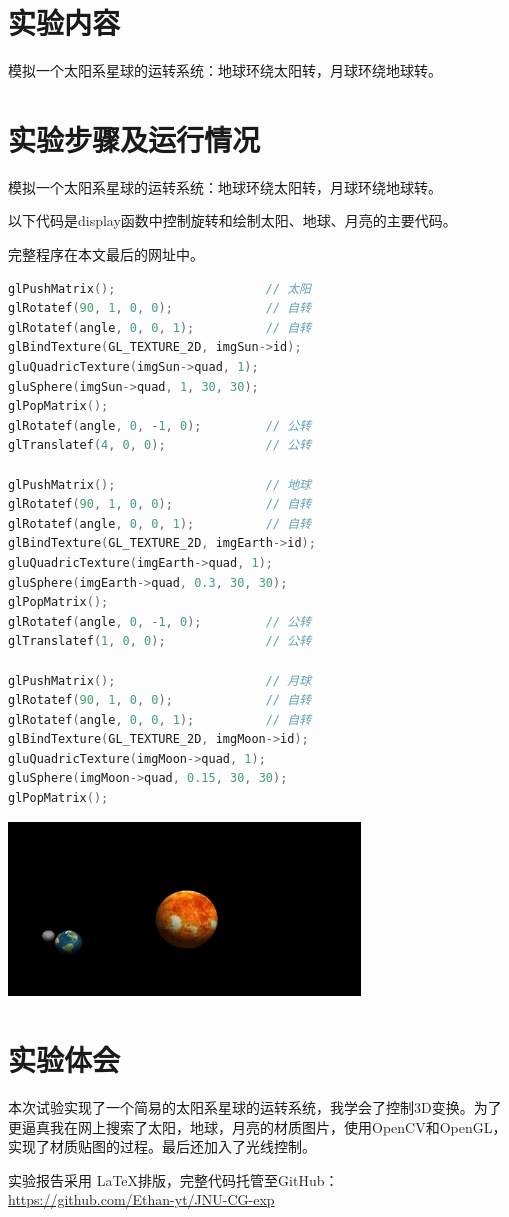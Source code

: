 \documentclass{JNUexp}
\begin{document}
 

\section{实验内容}
模拟一个太阳系星球的运转系统：地球环绕太阳转，月球环绕地球转。

\section{实验步骤及运行情况}
\begin{problem}
    模拟一个太阳系星球的运转系统：地球环绕太阳转，月球环绕地球转。
\end{problem}

\begin{answer}
以下代码是display函数中控制旋转和绘制太阳、地球、月亮的主要代码。

完整程序在本文最后的网址中。

    \begin{lstlisting}[language=C++]
glPushMatrix();                     // 太阳
glRotatef(90, 1, 0, 0);             // 自转
glRotatef(angle, 0, 0, 1);          // 自转
glBindTexture(GL_TEXTURE_2D, imgSun->id);
gluQuadricTexture(imgSun->quad, 1);
gluSphere(imgSun->quad, 1, 30, 30);
glPopMatrix();
glRotatef(angle, 0, -1, 0);         // 公转
glTranslatef(4, 0, 0);              // 公转

glPushMatrix();                     // 地球
glRotatef(90, 1, 0, 0);             // 自转
glRotatef(angle, 0, 0, 1);          // 自转
glBindTexture(GL_TEXTURE_2D, imgEarth->id);
gluQuadricTexture(imgEarth->quad, 1);
gluSphere(imgEarth->quad, 0.3, 30, 30);
glPopMatrix();
glRotatef(angle, 0, -1, 0);         // 公转
glTranslatef(1, 0, 0);              // 公转

glPushMatrix();                     // 月球
glRotatef(90, 1, 0, 0);             // 自转
glRotatef(angle, 0, 0, 1);          // 自转
glBindTexture(GL_TEXTURE_2D, imgMoon->id);
gluQuadricTexture(imgMoon->quad, 1);
gluSphere(imgMoon->quad, 0.15, 30, 30);
glPopMatrix();
    \end{lstlisting}
\end{answer}

\begin{image}
    \includegraphics[width=0.7\textwidth]{1}
\end{image}
\section{实验体会}
本次试验实现了一个简易的太阳系星球的运转系统，我学会了控制3D变换。为了更逼真我在网上搜索了太阳，地球，月亮的材质图片，使用OpenCV和OpenGL，实现了材质贴图的过程。最后还加入了光线控制。


\vfill

实验报告采用 \LaTeX 排版，完整代码托管至GitHub：\\
\url{https://github.com/Ethan-yt/JNU-CG-exp}
\end{document}
